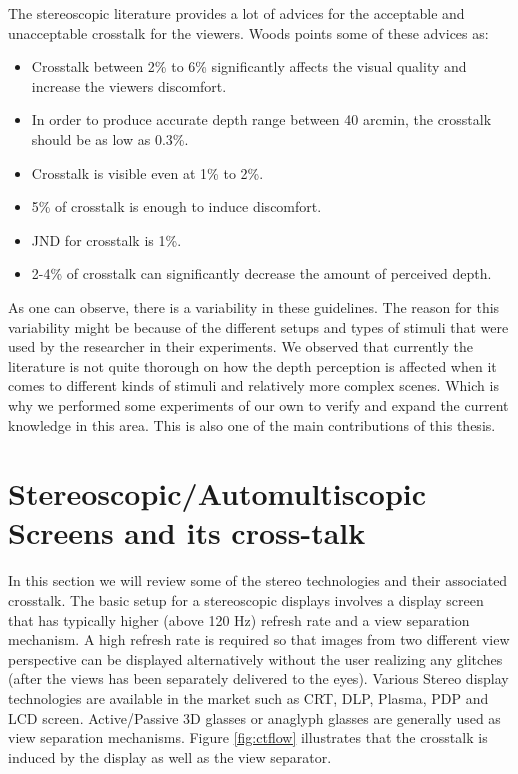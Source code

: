 The stereoscopic literature provides a lot of advices for the acceptable and unacceptable crosstalk for the viewers. Woods\cite{woods2012crosstalk} points some of these advices as:
\begin{itemize}
	\item Crosstalk between 2\% to 6\% significantly affects the visual quality and increase the viewers discomfort.
	\item In order to produce accurate depth range between 40 arcmin, the crosstalk should be as low as 0.3\%.
	\item Crosstalk is visible even at 1\% to 2\%.
	\item 5\% of crosstalk is enough to induce discomfort.
	\item JND for crosstalk is 1\%.
	\item 2-4\% of crosstalk can significantly decrease the amount of perceived depth.
\end{itemize}

As one can observe, there is a variability in these guidelines. The reason for this variability might be because of the different setups and types of stimuli that were used by the researcher in their experiments. We observed that currently the literature is not quite thorough on how the depth perception is affected when it comes to different kinds of stimuli and relatively more complex scenes. Which is why we performed some experiments of our own to verify and expand the current knowledge in this area. This is also one of the main contributions of this thesis.

\section{Stereoscopic/Automultiscopic Screens and its cross-talk}

In this section we will review some of the stereo technologies and their associated crosstalk. The basic setup for a stereoscopic displays involves a display screen that has typically higher (above 120 Hz) refresh rate and a view separation mechanism. A high refresh rate is required so that images from two different view perspective can be displayed alternatively without the user realizing any glitches (after the views has been separately delivered to the eyes). Various Stereo display technologies are available in the market such as CRT, DLP, Plasma, PDP and LCD screen. Active/Passive 3D glasses or anaglyph glasses are generally used as view separation mechanisms. Figure \ref{fig:ctflow} illustrates that the crosstalk is induced by the display as well as the view separator.

